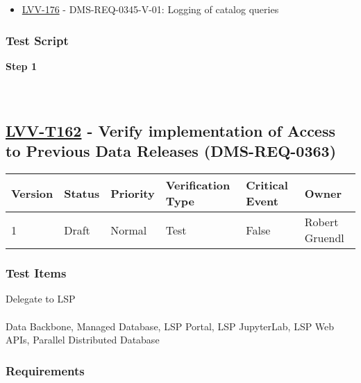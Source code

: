 \begin{itemize}
\tightlist
\item
  \href{https://jira.lsstcorp.org/browse/LVV-176}{LVV-176} -
  DMS-REQ-0345-V-01: Logging of catalog queries
\end{itemize}

\hypertarget{test-script-61}{%
\subsubsection{Test Script}\label{test-script-61}}

\textbf{Step 1}\\
~\\
~\\

\hypertarget{lvv-t162---verify-implementation-of-access-to-previous-data-releases-dms-req-0363}{%
\subsection{\texorpdfstring{\href{https://jira.lsstcorp.org/secure/Tests.jspa\#/testCase/LVV-T162}{LVV-T162}
- Verify implementation of Access to Previous Data Releases
(DMS-REQ-0363)}{LVV-T162 - Verify implementation of Access to Previous Data Releases (DMS-REQ-0363)}}\label{lvv-t162---verify-implementation-of-access-to-previous-data-releases-dms-req-0363}}

\begin{longtable}[]{@{}llllll@{}}
\toprule
Version & Status & Priority & Verification Type & Critical Event &
Owner\tabularnewline
\midrule
\endhead
1 & Draft & Normal & Test & False & Robert Gruendl\tabularnewline
\bottomrule
\end{longtable}

\hypertarget{test-items-62}{%
\subsubsection{Test Items}\label{test-items-62}}

Delegate to LSP\\
~\\
Data Backbone, Managed Database, LSP Portal, LSP JupyterLab, LSP Web
APIs, Parallel Distributed Database

\hypertarget{requirements-62}{%
\subsubsection{Requirements}\label{requirements-62}}

